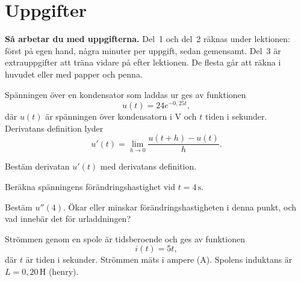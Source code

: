 
\section{Uppgifter}
\label{c14:sec:uppgifter}

\begin{aside}
\textbf{Så arbetar du med uppgifterna.} Del~1 och del~2 räknas under lektionen: först på egen
hand, några minuter per uppgift, sedan gemensamt. Del~3 är extrauppgifter att träna vidare på
efter lektionen. De flesta går att räkna i huvudet eller med papper och penna.

\end{aside}


Spänningen över en kondensator som laddas ur ges av funktionen
\[
  u(t) = 24e^{-0{,}25t},
\]
där $u(t)$ är spänningen över kondensatorn i V och $t$ tiden i sekunder. Derivatans definition
lyder
\[
  u'(t) = \lim_{h \to 0} \frac{u(t + h) - u(t)}{h}.
\]
\begin{parts}
  \item Bestäm derivatan $u'(t)$ med derivatans definition.
  \item Beräkna spänningens förändringshastighet vid $t = 4\,\text{s}$.
  \item Bestäm $u''(4)$. Ökar eller minskar förändringshastigheten i denna punkt, och vad innebär
    det för urladdningen?
\end{parts}


Strömmen genom en spole är tidsberoende och ges av funktionen
\[
  i(t) = 5t,
\]
där $t$ är tiden i sekunder. Strömmen mäts i ampere (A). Spolens induktans är
$L = 0{,}20\,\text{H}$ (henry).

